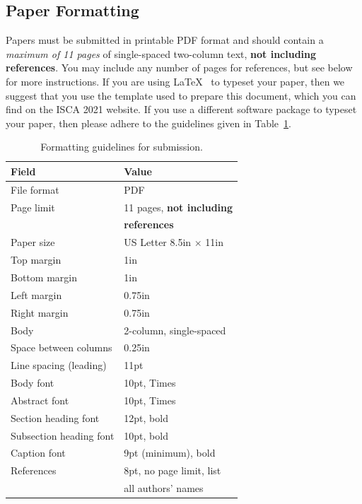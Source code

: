 \documentclass[conference]{IEEEtran}
\begin{document}
\subsection{Paper Formatting}
Papers must be submitted in printable PDF format and should contain a
{\em maximum of 11 pages} of single-spaced two-column text, {\bf not
  including references}.  You may include any number of pages for
references, but see below for more instructions.  If you are using
\LaTeX~\cite{lamport94} to typeset your paper, then we suggest that
you use the template used to prepare this document, which you can find
on the ISCA 2021 website. If you use a different
software package to typeset your paper, then please adhere to the
guidelines given in Table~\ref{table:formatting}.

\begin{scriptsize}
\begin{table}[h!]
  \centering
  \caption{Formatting guidelines for submission.}
  \label{table:formatting}
  \begin{tabular}{|l|l|}
    \hline
    \textbf{Field} & \textbf{Value}\\
    \hline
    \hline
    File format & PDF \\
    \hline
    Page limit & 11 pages, {\bf not including}\\
               & {\bf references}\\
    \hline
    Paper size & US Letter 8.5in $\times$ 11in\\
    \hline
    Top margin & 1in\\
    \hline
    Bottom margin & 1in\\
    \hline
    Left margin & 0.75in\\
    \hline
    Right margin & 0.75in\\
    \hline
    Body & 2-column, single-spaced\\
    \hline
    Space between columns & 0.25in\\
    \hline
    Line spacing (leading) & 11pt \\
    \hline
    Body font & 10pt, Times\\
    \hline
    Abstract font & 10pt, Times\\
    \hline
    Section heading font & 12pt, bold\\
    \hline
    Subsection heading font & 10pt, bold\\
    \hline
    Caption font & 9pt (minimum), bold\\
    \hline
    References & 8pt, no page limit, list \\
               & all authors' names\\
    \hline
  \end{tabular}
\end{table}
\end{scriptsize}
\end{document}
